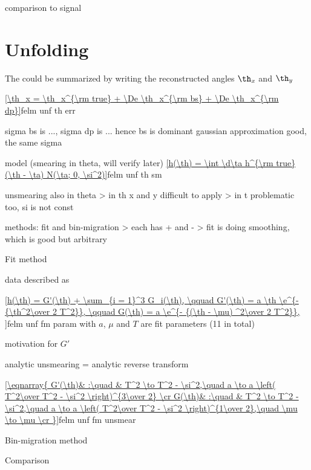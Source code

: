 \> comparison to signal


\section{Unfolding}

The  could be summarized by writing the reconstructed angles $\th_x$ and $\th_y$

\eqref{\th_x = \th_x^{\rm true} + \De \th_x^{\rm bs} + \De \th_x^{\rm dp}}{felm unf th err}

\> sigma bs is ..., sigma dp is ... hence bs is dominant
\> gaussian approximation good, the same sigma

\> model (smearing in theta, will verify later)
\eqref{h(\th) = \int \d\ta h^{\rm true}(\th - \ta) N(\ta; 0, \si^2)}{felm unf th sm}

\> unsmearing also in theta
\>> in th x and y difficult to apply
\>> in t problematic too, si is not const

 methods: fit and bin-migration
\>> each has + and -
\>> fit is doing smoothing, which is good but arbitrary

\caption{Fit method}

\> data described as

\eqref{h(\th) = G'(\th) + \sum_{i = 1}^3 G_i(\th),
	\qquad G'(\th) = a \th \e^{- {\th^2\over 2 T^2}},
	\qquad G(\th) = a \e^{- {(\th - \mu) ^2\over 2 T^2}},
}{felm unf fm param}
with $a$, $\mu$ and $T$ are fit parameters (11 in total)

\> motivation for $G'$

\> analytic unsmearing = analytic reverse transform 

\eqref{\eqnarray{
G'(\th)& :\quad & T^2 \to T^2 - \si^2,\quad a \to a \left( T^2\over T^2 - \si^2 \right)^{3\over 2} \cr
G(\th)& :\quad & T^2 \to T^2 - \si^2,\quad a \to a \left( T^2\over T^2 - \si^2 \right)^{1\over 2},\quad \mu \to \mu \cr
}}{felm unf fm unsmear}

\bmfig
{}
\emfig


\caption{Bin-migration method}

\bmfig
{}
\emfig

\caption{Comparison}

